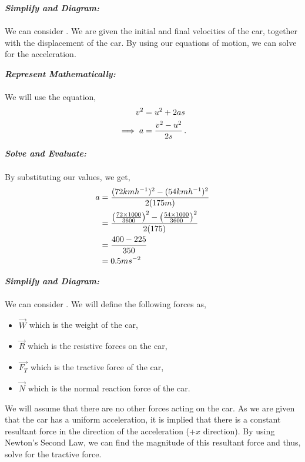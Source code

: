 \begin{subquestions}
\begin{subsubquestions}
\subsubquestion

\textbf{\textit{Simplify and Diagram:}} \\ \\
We can consider . We are given the initial and final velocities of the car, together with the displacement of the car. By using our equations of motion, we can solve for the acceleration.




\textbf{\textit{Represent Mathematically:}} \\ \\
We will use the equation,
\begin{align}
	v^2 & = u^2 + 2as \nonumber \\
	\implies a & = \frac{v^2-u^2}{2s} \,.	
\end{align}




\textbf{\textit{Solve and Evaluate:}} \\ \\
By substituting our values, we get,
\begin{align}
	a & = \frac{(72kmh^{-1})^2-(54kmh^{-1})^2}{2(175m)} \nonumber \\
	  & = \frac{\left(\frac{72\times 1000}{3600}\right)^2-\left(\frac{54\times 1000}{3600}\right)^2}{2(175)} \nonumber \\
	  & = \frac{400-225}{350} \nonumber \\
	  & = 0.5ms^{-2} 
\end{align}


\subsubquestion

\textbf{\textit{Simplify and Diagram:}} \\ \\
We can consider . We will define the following forces as,
\begin{itemize}
	\item $\vec{W}$ which is the weight of the car,
	\item $\vec{R}$ which is the resistive forces on the car,
	\item $\vec{F_T}$ which is the tractive force of the car,
	\item $\vec{N}$ which is the normal reaction force of the car.
\end{itemize}
We will assume that there are no other forces acting on the car. As we are given that the car has a uniform acceleration, it is implied that there is a constant resultant force in the direction of the acceleration (+$x$ direction). By using Newton's Second Law, we can find the magnitude of this resultant force and thus, solve for the tractive force.




\end{subsubquestions}
\end{subquestions}
